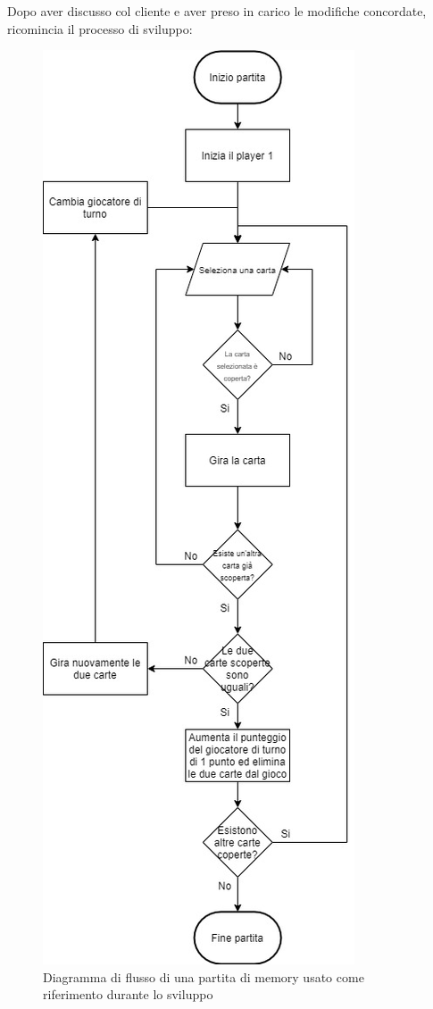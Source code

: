 \documentclass[12pt]{article}
\begin{document}
Dopo aver discusso col cliente e aver preso in carico le modifiche concordate, ricomincia il processo di sviluppo:

\begin{figure}[H]
\centering
\includegraphics[scale=.5]{MemoryFlowChart}
\caption{Diagramma di flusso di una partita di memory usato come riferimento durante lo sviluppo}
\label{img:MemoryFC}
\end{figure}
\end{document}
